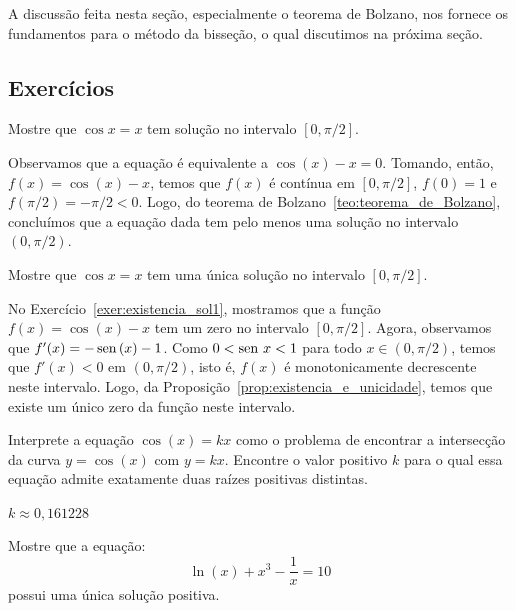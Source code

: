 A discussão feita nesta seção, especialmente o teorema de Bolzano, nos fornece os fundamentos para o método da bisseção, o qual discutimos na próxima seção.

\subsection*{Exercícios}
\begin{exer}\label{exer:existencia_sol1}
  Mostre que $\cos x = x$ tem solução no intervalo $[0, \pi/2]$.
\end{exer}
\begin{resp}

  Observamos que a equação é equivalente a $\cos(x) - x = 0$. Tomando, então, $f(x) = \cos(x) - x$, temos que $f(x)$ é contínua em $[0, \pi/2]$, $f(0) = 1$ e $f(\pi/2) = -\pi/2 < 0$. Logo, do teorema de Bolzano~\ref{teo:teorema_de_Bolzano}, concluímos que a equação dada tem pelo menos uma solução no intervalo $(0, \pi/2)$.

\end{resp}

\begin{exer}
  Mostre que $\cos x = x$ tem uma única solução no intervalo $[0, \pi/2]$.
\end{exer}
\begin{resp}

    No Exercício~\ref{exer:existencia_sol1}, mostramos que a função $f(x) = \cos(x) - x$ tem um zero no intervalo $[0, \pi/2]$. Agora, observamos que $f'(x) = -\operatorname{sen}\,(x) - 1$. Como $0 < \operatorname{sen}\, x < 1$ para todo $x\in (0, \pi/2)$, temos que $f'(x) < 0$ em $(0, \pi/2)$, isto é, $f(x)$ é monotonicamente decrescente neste intervalo. Logo, da Proposição~\ref{prop:existencia_e_unicidade}, temos que existe um único zero da função neste intervalo.

\end{resp}

\begin{exer} Interprete a equação $\cos(x)=kx$ como o problema de encontrar a intersecção da curva $y=\cos(x)$ com $y=kx$. Encontre o valor positivo $k$ para o qual essa equação admite exatamente duas raízes positivas distintas.
\end{exer}
\begin{resp}

    $k\approx 0,161228$

\end{resp}


\begin{exer}Mostre que a equação:
  \begin{equation}
    \ln(x)+x^3-\frac{1}{x}=10
  \end{equation}
possui uma única solução positiva.
\end{exer}

